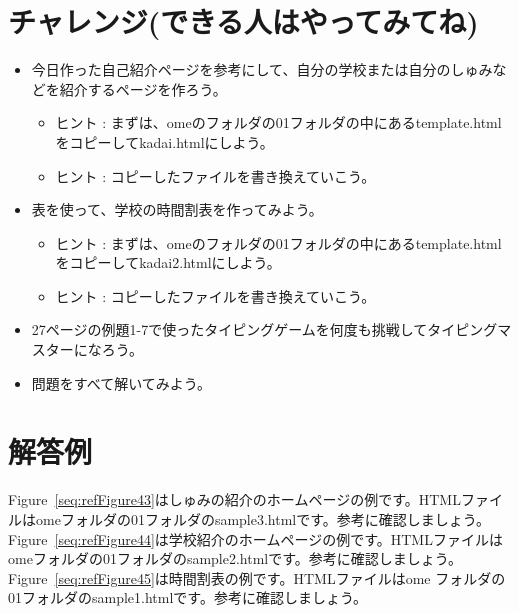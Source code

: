 \documentclass[a4paper,12pt]{jarticle}
\newcounter{Figure}
\begin{document}
\clearpage
\section{チャレンジ(できる人はやってみてね)}
\begin{itemize}
\item
今日作った自己紹介ページを参考にして、自分の学校または自分のしゅみなどを紹介するページを作ろう。

\begin{itemize}
\item ヒント :
まずは、omeのフォルダの01フォルダの中にあるtemplate.htmlをコピーしてkadai.htmlにしよう。
\item ヒント :
コピーしたファイルを書き換えていこう。
\end{itemize}
\item
表を使って、学校の時間割表を作ってみよう。

\begin{itemize}
\item ヒント :
まずは、omeのフォルダの01フォルダの中にあるtemplate.htmlをコピーしてkadai2.htmlにしよう。
\item ヒント :
コピーしたファイルを書き換えていこう。
\end{itemize}
\item
27ページの例題1-7で使ったタイピングゲームを何度も挑戦してタイピングマスターになろう。
\item 問題をすべて解いてみよう。
\end{itemize}

\bigskip


\bigskip


\bigskip

\clearpage\section{解答例}
{Figure~\ref{seq:refFigure43}はしゅみの紹介のホームページの例です。HTMLファイルはomeフォルダの01フォルダのsample3.htmlです。参考に確認しましょう。}\\
{Figure~\ref{seq:refFigure44}は学校紹介のホームページの例です。HTMLファイルはomeフォルダの01フォルダのsample2.htmlです。参考に確認しましょう。}\\
{Figure~\ref{seq:refFigure45}は時間割表の例です。HTMLファイルはome
フォルダの01フォルダのsample1.htmlです。参考に確認しましょう。}\\
\end{document}
